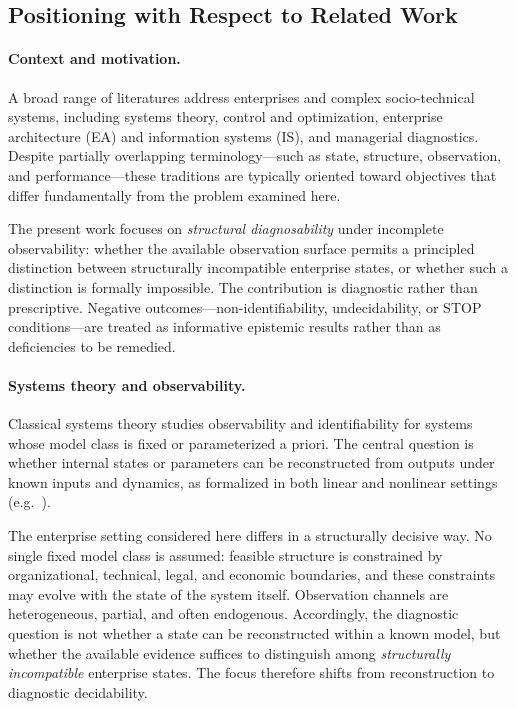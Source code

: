 \subsection{Positioning with Respect to Related Work}

\paragraph{Context and motivation.}
A broad range of literatures address enterprises and complex socio-technical systems, including systems theory, control and optimization, enterprise architecture (EA) and information systems (IS), and managerial diagnostics.
Despite partially overlapping terminology—such as state, structure, observation, and performance—these traditions are typically oriented toward objectives that differ fundamentally from the problem examined here.

The present work focuses on \emph{structural diagnosability} under incomplete observability: whether the available observation surface permits a principled distinction between structurally incompatible enterprise states, or whether such a distinction is formally impossible.
The contribution is diagnostic rather than prescriptive.
Negative outcomes—non-identifiability, undecidability, or STOP conditions—are treated as informative epistemic results rather than as deficiencies to be remedied.

\paragraph{Systems theory and observability.}
Classical systems theory studies observability and identifiability for systems whose model class is fixed or parameterized a priori.
The central question is whether internal states or parameters can be reconstructed from outputs under known inputs and dynamics, as formalized in both linear and nonlinear settings (e.g.\ \cite{kalman1960_filtering,hermannkrener1977_nonlinear_obs,isidori1995_nonlinear_control}).

The enterprise setting considered here differs in a structurally decisive way.
No single fixed model class is assumed: feasible structure is constrained by organizational, technical, legal, and economic boundaries, and these constraints may evolve with the state of the system itself.
Observation channels are heterogeneous, partial, and often endogenous.
Accordingly, the diagnostic question is not whether a state can be reconstructed within a known model, but whether the available evidence suffices to distinguish among \emph{structurally incompatible} enterprise states.
The focus therefore shifts from reconstruction to diagnostic decidability.

